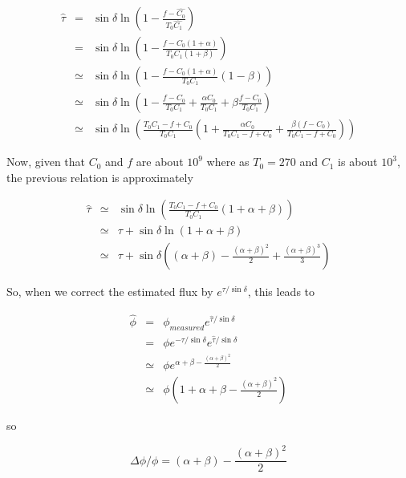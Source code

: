 \begin{eqnarray}
\hat{\tau} &=& \sin\delta \ln\left(1-\frac{f-\hat{C_0}}{T_0\hat{C_1}}\right) \nonumber \\
&=& \sin\delta \ln\left(1-\frac{f-C_0(1+\alpha)}{T_0C_1(1+\beta)}\right) \nonumber\\
&\simeq& \sin\delta \ln\left(1-\frac{f-C_0(1+\alpha)}{T_0C_1}(1-\beta)\right) \nonumber\\
&\simeq& \sin\delta \ln\left(1-\frac{f-C_0}{T_0C_1} + \frac{\alpha C_0}{T_0C_1} +
\beta\frac{f-C_0}{T_0C_1}\right) \nonumber\\
&\simeq& \sin\delta \ln\left( \frac{T_0C_1-f+C_0}{T_0C_1}\left(1+\frac{\alpha
  C_0}{T_0C_1-f+C_0}+\frac{\beta(f-C_0)}{T_0C_1-f+C_0}\right)\right)\nonumber
\end{eqnarray}

Now, given that $C_0$ and $f$ are about $10^9$ where as $T_0 = 270$ and $C_1$ is
about $10^3$, the previous relation is approximately

\begin{eqnarray}
\hat{\tau} &\simeq& \sin\delta \ln\left(
\frac{T_0C_1-f+C_0}{T_0C_1}(1+\alpha+\beta)\right) \nonumber\\
&\simeq& \tau + \sin\delta\ln(1+\alpha+\beta)\nonumber\\
&\simeq& \tau + \sin\delta\left(
(\alpha+\beta)-\frac{(\alpha+\beta)^2}{2}+\frac{(\alpha+\beta)^3}{3}\right)
\end{eqnarray}

So, when we correct the estimated flux by $e^{\tau/\sin\delta}$, this leads to

\begin{eqnarray}
\hat{\phi} & = & \phi_{measured}e^{\hat{\tau}/\sin\delta} \nonumber \\
&=&\phi e^{-\tau/\sin\delta}e^{\hat{\tau}/\sin\delta} \nonumber \\
&\simeq&\phi e^{\alpha+\beta - \frac{(\alpha+\beta)^2}{2}} \nonumber \\
&\simeq& \phi (1 + \alpha+\beta - \frac{(\alpha+\beta)^2}{2}) \nonumber
\end{eqnarray}

so 

\begin{equation}
\Delta\phi/\phi = (\alpha+\beta)-\frac{(\alpha+\beta)^2}{2}
\end{equation}
